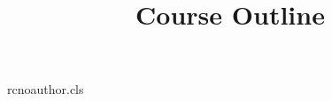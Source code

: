 \begin{filecontents*}[overwrite]{rcnoauthor.cls}
\newcommand*\department[1]{\def\@department{#1}}
\department{}
\def\@maketitle{\@title\par[\@department]}
\end{filecontents*}
\documentclass{rcnoauthor}
\title{Course Outline}

\maketitle
Text.

